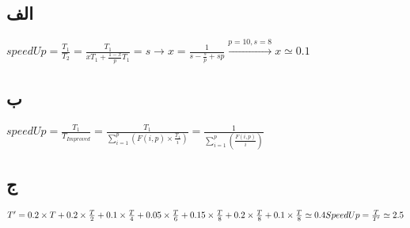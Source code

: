\subsection*{الف}

\setLTR
$
speedUp = \frac{T_1}{T_2} = \frac{T_1}{xT_1+\frac{1-x}{p}T_1} = s \longrightarrow x = \frac{1}{s-\frac{s}{p}+sp} \xrightarrow{p=10 , s=8} x \simeq 0.1
$
\setRTL


\subsection*{ب}

\setLTR
$
speedUp = \frac{T_1}{T_{Improved}} = \frac{T_1}{\sum_{i=1}^{p}(F(i,p)\times\frac{T_1}{i})} = \frac{1}{\sum_{i=1}^{p}(\frac{F(i,p)}{i})}
$
\setRTL

\subsection*{ج}

\setLTR
$
T' = 0.2\times T + 0.2 \times \frac{T}{2} + 0.1 \times \frac{T}{4} + 0.05 \times \frac{T}{6} + 0.15 \times \frac{T}{8}+ 0.2 \times \frac{T}{8} + 0.1 \times \frac{T}{8} \simeq 0.4 \\
SpeedUp = \frac{T}{T'}  \simeq  2.5
$
\setRTL